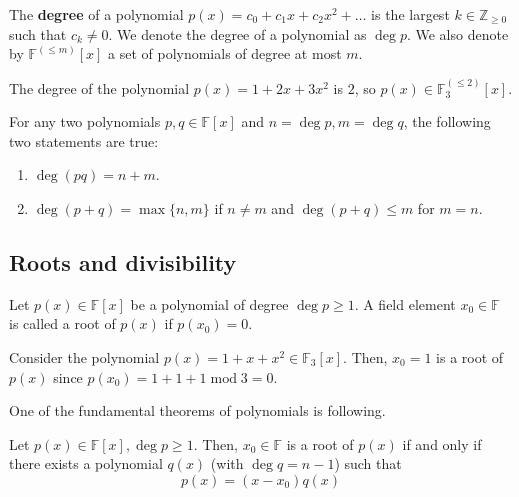 \documentclass[../lecture-notes-148x210.tex]{subfiles}
\begin{document}
\begin{definition}
    The \textbf{degree} of a polynomial $p(x) = c_0+c_1x+c_2x^2+\dots$ is the largest $k \in \mathbb{Z}_{\geq 0}$ such that $c_k \neq 0$. We denote the degree of a polynomial as $\deg p$. We also denote by $\mathbb{F}^{(\leq m)}[x]$ a set of polynomials of degree at most $m$.
\end{definition}

\begin{example}
    The degree of the polynomial $p(x) = 1 + 2x + 3x^2$ is $2$, so $p(x) \in \mathbb{F}_3^{(\leq 2)}[x]$.
\end{example}

\begin{theorem}
    For any two polynomials $p,q \in \mathbb{F}[x]$ and $n = \deg p, m = \deg q$, the following two statements are true:
    \begin{enumerate}
        \item $\deg (pq) = n + m$.
        \item $\deg (p + q) = \max\{n,m\}$ if $n \neq m$ and $\deg (p+q) \leq m$ for $m=n$.
    \end{enumerate}
\end{theorem}

\subsection{Roots and divisibility}

\begin{definition}
    Let $p(x) \in \mathbb{F}[x]$ be a polynomial of degree $\deg p \geq 1$. A field element $x_0 \in \mathbb{F}$ is called a root of $p(x)$ if $p(x_0) = 0$.
\end{definition}

\begin{example}
    Consider the polynomial $p(x) = 1 + x + x^2 \in \mathbb{F}_3[x]$. Then, $x_0=1$ is a root of $p(x)$ since $p(x_0) = 1 + 1 + 1 \; \text{mod} \; 3 = 0$.
\end{example}

One of the fundamental theorems of polynomials is following.

\begin{theorem}
    Let $p(x) \in \mathbb{F}[x], \deg p \geq 1$. Then, $x_0 \in \mathbb{F}$ is a root of $p(x)$ if and only if there exists a polynomial $q(x)$ (with $\deg q = n-1$) such that
    \begin{equation*}
        p(x) = (x-x_0)q(x)
    \end{equation*}
\end{theorem}
\end{document}
